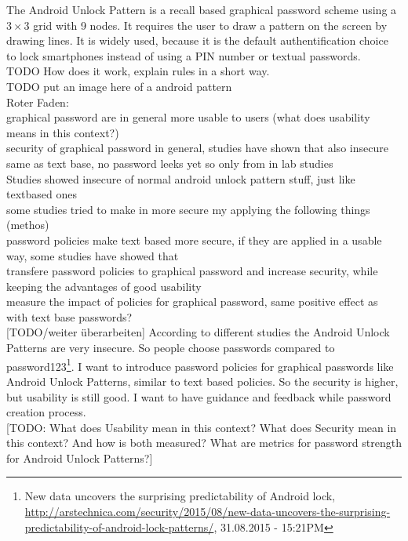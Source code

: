 \documentclass[twocolumn, a4paper, 10pt]{article}
\begin{document}
The Android Unlock Pattern is a recall based graphical password scheme using a $3\times3$ grid with 9 nodes. It requires the user to draw a pattern on the screen by drawing lines. It is widely used, because it is the default authentification choice to lock smartphones instead of using a PIN number or textual passwords.\\

TODO How does it work, explain rules in a short way.\\
TODO put an image here of a android pattern\\

Roter Faden:\\
graphical password are in general more usable to users (what does usability means in this context?)\\
security of graphical password in general, studies have shown that also insecure same as text base, no password leeks yet so only from in lab studies\\
Studies showed insecure of normal android unlock pattern stuff, just like textbased ones\\
some studies tried to make in more secure my applying the following things (methos)\\
password policies make text based more secure, if they are applied in a usable way, some studies have showed that\\
transfere password policies to graphical password and increase security, while keeping the advantages of good usability\\
measure the impact of policies for graphical password, same positive effect as with text base passwords?\\

[TODO/weiter überarbeiten]
According to different studies the Android Unlock Patterns are very insecure. So people choose passwords compared to password123\footnote{New data uncovers the surprising predictability of Android lock, \url{http://arstechnica.com/security/2015/08/new-data-uncovers-the-surprising-predictability-of-android-lock-patterns/}, 31.08.2015 - 15:21PM}. I want to introduce password policies for  graphical passwords like Android Unlock Patterns, similar to text based policies. So the security is higher, but usability is still good. I want to have guidance and feedback while password creation process.\\

[TODO: What does Usability mean in this context? What does Security mean in this context? And how is both measured? What are metrics for password strength for Android Unlock Patterns?]\\
\end{document}
